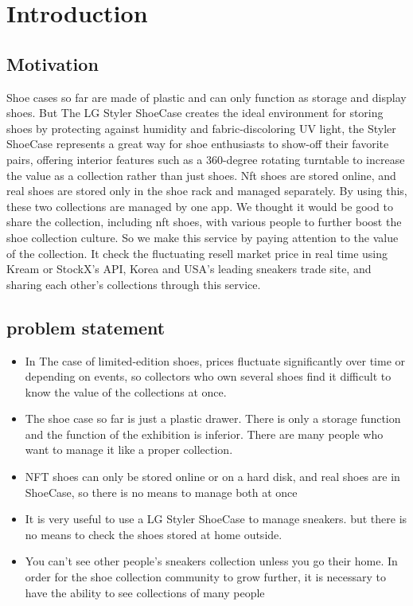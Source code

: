 \documentclass[conference]{IEEEtran}
\begin{document}
\section{Introduction}
\subsection{Motivation}
Shoe cases so far are made of plastic and can only function as storage and display shoes. But The LG Styler ShoeCase creates the ideal environment for storing shoes by protecting against humidity and fabric-discoloring UV light, the Styler ShoeCase represents a great way for shoe enthusiasts to show-off their favorite pairs, offering interior features such as a 360-degree rotating turntable to increase the value as a collection rather than just shoes. 
Nft shoes are stored online, and real shoes are stored only in the shoe rack and managed separately. By using this, these two collections are managed by one app. We thought it would be good to share the collection, including nft shoes, with various people to further boost the shoe collection culture.
So we make this service by paying attention to the value of the collection. It check the fluctuating resell market price in real time using Kream or StockX's API, Korea and USA's leading sneakers trade site, and sharing each other's collections through this service.


\subsection{problem statement}
\begin{itemize}
\item In The case of limited-edition shoes, prices fluctuate significantly over time or depending on events, so collectors who own several shoes find it difficult to know the value of the collections at once.
\item The shoe case so far is just a plastic drawer. There is only a storage function and the function of the exhibition is inferior. There are many people who want to manage it like a proper collection.
\item NFT shoes can only be stored online or on a hard disk, and real shoes are in ShoeCase, so there is no means to manage both at once
\item It is very useful to use a LG Styler ShoeCase to manage sneakers. but there is no means to check the shoes stored at home outside.
\item You can't see other people's sneakers collection unless you go their home. In order for the shoe collection community to grow further, it is necessary to have the ability to see collections of many people
\end{itemize}
\end{document}
